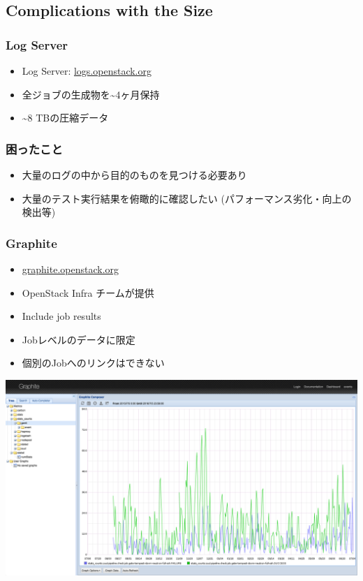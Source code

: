 \documentclass[aspectratio=169,11pt,hyperref={colorlinks=true}]{beamer}
\begin{document}
\subsection{Complications with the Size}
\begin{frame}
  \frametitle{Log Server}
  \begin{itemize}
    \item Log Server: \href{http://logs.openstack.org/}{logs.openstack.org}
    \item 全ジョブの生成物を\textasciitilde4ヶ月保持
    \item \textasciitilde8 TBの圧縮データ
  \end{itemize}
\end{frame}

\begin{frame}
  \frametitle{困ったこと}
  \begin{itemize}
    \item 大量のログの中から目的のものを見つける必要あり
    \item 大量のテスト実行結果を俯瞰的に確認したい (パフォーマンス劣化・向上の検出等)
  \end{itemize}
\end{frame}

\begin{frame}
  \frametitle{Graphite}
  \begin{itemize}
    \item \href{http://graphite.openstack.org/}{graphite.openstack.org}
    \item OpenStack Infra チームが提供
    \item Include job results
    \item Jobレベルのデータに限定
    \item 個別のJobへのリンクはできない
  \end{itemize}
  \begin{center}
    \includegraphics[width=.65\textwidth]{graphite-sample.png}
  \end{center}
\end{frame}
\end{document}
